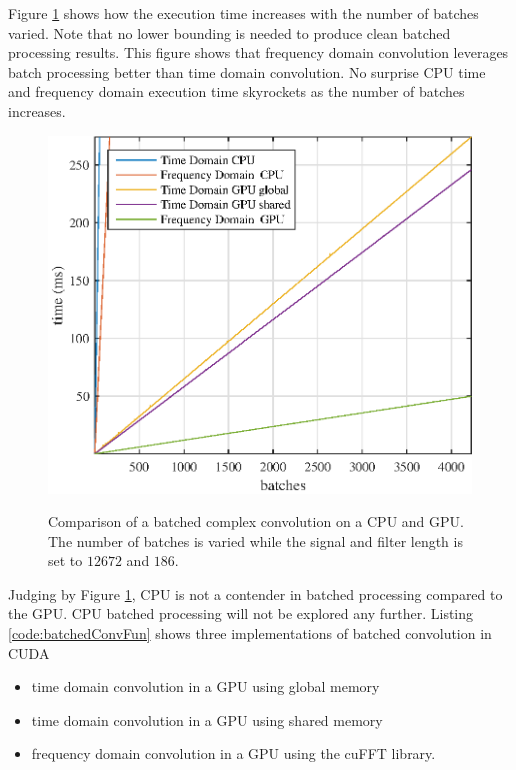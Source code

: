 Figure \ref{fig:CPUvsGPU_varyBatches_186taps_12672signal} shows how the execution time increases with the number of batches varied.
Note that no lower bounding is needed to produce clean batched processing results.
This figure shows that frequency domain convolution leverages batch processing better than time domain convolution.
No surprise CPU time and frequency domain execution time skyrockets as the number of batches increases.
\begin{figure}
	\caption{Comparison of a batched complex convolution on a CPU and GPU. The number of batches is varied while the signal and filter length is set to $12672$ and $186$.}
	\centering\includegraphics[width=5in]{figures/gpu_intro/CPUvsGPU_varyBatches_186taps_12672signal.eps}
	\label{fig:CPUvsGPU_varyBatches_186taps_12672signal}
\end{figure}

Judging by Figure \ref{fig:CPUvsGPU_varyBatches_186taps_12672signal}, CPU is not a contender in batched processing compared to the GPU.
CPU batched processing will not be explored any further.
Listing \ref{code:batchedConvFun} shows three implementations of batched convolution in CUDA
\begin{itemize}
  \item time domain convolution in a GPU using global memory
  \item time domain convolution in a GPU using shared memory
  \item frequency domain convolution in a GPU using the cuFFT library.
\end{itemize}

